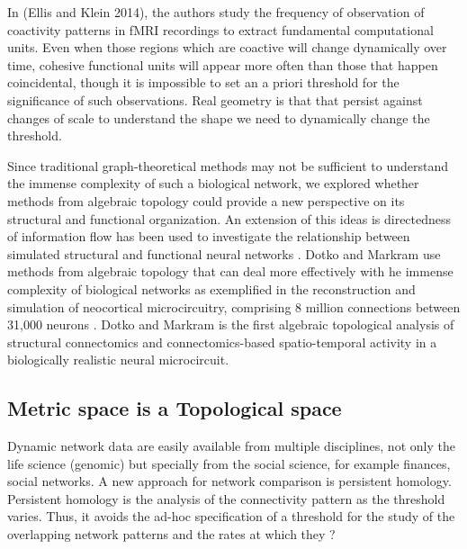 \documentclass[onecollarge,runningheads]{svjour2}
\begin{document}
In (Ellis and Klein 2014), the authors study the frequency of observation of coactivity patterns in fMRI recordings to extract fundamental computational units. Even when those regions which are coactive will change dynamically over time, cohesive functional units will appear more often than those that happen coincidental, though it is impossible to set an a priori threshold for the significance of such observations.
Real geometry is that that persist against changes of scale to understand the shape we need to dynamically change the threshold.

Since traditional graph-theoretical methods may not be sufficient to understand the immense complexity of such a biological network, we explored whether methods from algebraic topology could provide a new perspective on its structural and functional organization. 
An extension of this ideas is directedness of information flow has been used to investigate the relationship between simulated structural and functional neural networks \citep{dotko2016topological}. %
Dotko and Markram use methods from algebraic topology that can deal more effectively with he immense complexity of biological networks 
as exemplified in the reconstruction and simulation of neocortical microcircuitry, comprising 8 million connections between 31,000 neurons \citep{markram2015reconstruction}. Dotko and Markram is the first algebraic topological analysis of structural connectomics and connectomics-based spatio-temporal activity in a biologically realistic neural microcircuit.  


\subsection{Metric space is a Topological space}
\label{sec:1}


Dynamic network data are easily available from multiple disciplines, not only the life science (genomic) but specially from the social science, for example finances, social networks. A new approach for network comparison is persistent homology. Persistent homology is the analysis of the connectivity pattern as the threshold varies. Thus, it avoids the ad-hoc specification of a threshold for the study of the overlapping network patterns and the rates at which they ?
\end{document}
